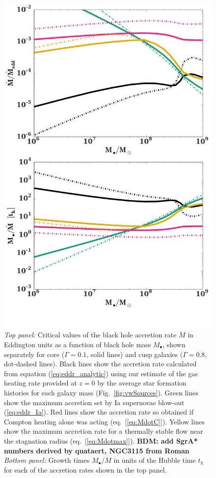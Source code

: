 \documentclass[usenatbib,fleqn]{mn2e}
\newcommand{\Mdot}{\dot{M}}
\newcommand{\Mbh}[1][]{M_{\bullet#1}}
\renewcommand{\th}{t_h}
\begin{document}
\begin{figure}
\includegraphics[width=\columnwidth]{mdot_sfr.pdf}
\caption{\label{fig:bh_growth} {\it Top panel:} Critical values of the black hole accretion rate $\dot{M}$ in Eddington units as a function of black hole mass $M_{\bullet}$, shown separately for core ($\Gamma=0.1$, solid lines) and cusp galaxies ($\Gamma=0.8$, dot-dashed lines).  Black lines show the accretion rate calculated from equation (\ref{eq:eddr_analytic}) using our estimate of the gas heating rate provided at $z = 0$ by the average star formation histories for each galaxy mass (Fig.~\ref{fig:vwSources}).  Green lines show the maximum accretion set by Ia supernovae blow-out (\ref{eq:eddr_Ia}).  Red lines show the accretion rate so obtained if Compton heating alone was acting (eq.~[\ref{eq:MdotC}]).  Yellow lines show the maximum accretion rate for a thermally stable flow near the stagnation radius (eq.~[\ref{eq:Mdotmax}]).  {\bf BDM: add SgrA* numbers derived by quataert, NGC3115 from Roman} {\it Bottom panel:} Growth times $\Mbh/\Mdot$ in units
  of the Hubble time $\th$ for each of the accretion rates shown in the top panel.}
\end{figure}
\end{document}
